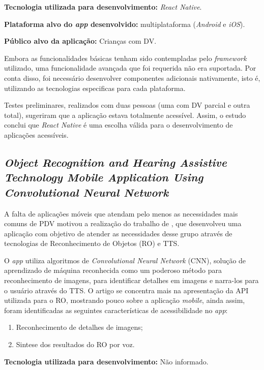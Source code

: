 \textbf{Tecnologia utilizada para desenvolvimento:} \emph{React Native}.

\textbf{Plataforma alvo do \emph{app} desenvolvido:} multiplataforma (\emph{Android} e \emph{iOS}).

\textbf{Público alvo da aplicação:} Crianças com DV\@.

Embora as funcionalidades básicas tenham sido contempladas pelo \emph{framework} utilizado, uma funcionalidade avançada que foi requerida não era suportada.
Por conta disso, foi necessário desenvolver componentes adicionais nativamente, isto é, utilizando as tecnologias especificas para cada plataforma.

Testes preliminares, realizados com duas pessoas (uma com DV parcial e outra total), sugeriram que a aplicação estava totalmente acessível.
Assim, o estudo conclui que \emph{React Native} é uma escolha válida para o desenvolvimento de aplicações acessíveis.

\subsection{\emph{Object Recognition and Hearing Assistive Technology Mobile Application Using Convolutional Neural Network}}

A falta de aplicações móveis que atendam pelo menos as necessidades mais comuns de PDV motivou a realização do trabalho de , que desenvolveu uma aplicação com objetivo de atender as necessidades desse grupo através de tecnologias de Reconhecimento de Objetos (RO) e TTS\@.

O \emph{app} utiliza algoritmos de \emph{Convolutional Neural Network} (CNN), solução de aprendizado de máquina reconhecida como um poderoso método para reconhecimento de imagens, para identificar detalhes em imagens e narra-los para o usuário através do TTS\@.
O artigo se concentra mais na apresentação da API utilizada para o RO, mostrando pouco sobre a aplicação \emph{mobile}, ainda assim, foram identificadas as seguintes características de acessibilidade no \emph{app}: 

\begin{enumerate}
\item Reconhecimento de detalhes de imagens;
\item Sintese dos resultados do RO por voz.
\end{enumerate}

\textbf{Tecnologia utilizada para desenvolvimento:} Não informado.

